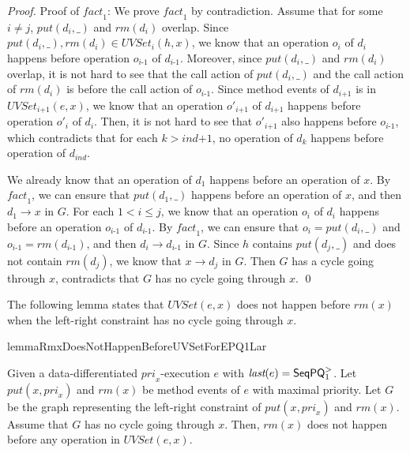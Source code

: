 \begin {proof}
Proof of $\textit{fact}_1$: We prove $\textit{fact}_1$ by contradiction. Assume that for some $i \neq j$, $\textit{put}(d_i,\_)$ and $\textit{rm}(d_i)$ overlap. Since $\textit{put}(d_i,\_), \textit{rm}(d_i) \in \textit{UVSet}_i(h,x)$, we know that an operation $o_i$ of $d_i$ happens before operation $o_{\textit{i-1}}$ of $d_{\textit{i-1}}$. Moreover, since $\textit{put}(d_i,\_)$ and $\textit{rm}(d_i)$ overlap, it is not hard to see that the call action of $\textit{put}(d_i,\_)$ and the call action of $\textit{rm}(d_i)$ is before the call action of $o_{\textit{i-1}}$. Since method events of $d_{\textit{i+1}}$ is in $\textit{UVSet}_{\textit{i+1}}(e,x)$, we know that an operation $o'_{\textit{i+1}}$ of $d_{\textit{i+1}}$ happens before operation $o'_i$ of $d_i$. Then, it is not hard to see that $o'_{\textit{i+1}}$ also happens before $o_{\textit{i-1}}$, which contradicts that for each $k > \textit{ind+1}$, no operation of $d_k$ happens before operation of $d_{\textit{ind}}$.

We already know that an operation of $d_1$ happens before an operation of $x$. By $\textit{fact}_1$, we can ensure that $\textit{put}(d_1,\_)$ happens before an operation of $x$, and then $d_1 \rightarrow x$ in $G$. For each $1 < i \leq j$, we know that an operation $o_i$ of $d_i$ happens before an operation $o_{\textit{i-1}}$ of $d_{\textit{i-1}}$. By $\textit{fact}_1$, we can ensure that $o_i=\textit{put}(d_i,\_)$ and $o_{\textit{i-1}}=\textit{rm}(d_{\textit{i-1}})$, and then $d_i \rightarrow d_{\textit{i-1}}$ in $G$. Since $h$ contains $\textit{put}(d_j,\_)$ and does not contain $\textit{rm}(d_j)$, we know that $x \rightarrow d_j$ in $G$. Then $G$ has a cycle going through $x$, contradicts that $G$ has no cycle going through $x$. \qed
\end {proof}


The following lemma states that $\textit{UVSet}(e,x)$ does not happen before $\textit{rm}(x)$ when the left-right constraint has no cycle going through $x$.

\begin{restatable}{lemma}{RmxDoesNotHappenBeforeUVSetForEPQ1Lar}
\label{lemma:Rmx does not happen before UVSet for EPQ1Lar}

Given a data-differentiated $\textit{pri}_x$-execution $e$ with $\textit{last}(e) = \mathsf{SeqPQ}_1^{>}$. Let $\textit{put}(x,\textit{pri}_x)$ and $\textit{rm}(x)$ be method events of $e$ with maximal priority. Let $G$ be the graph representing the left-right constraint of $\textit{put}(x,\textit{pri}_x)$ and $\textit{rm}(x)$. Assume that $G$ has no cycle going through $x$. Then, $\textit{rm}(x)$ does not happen before any operation in $\textit{UVSet}(e,x)$.
\end{restatable}

